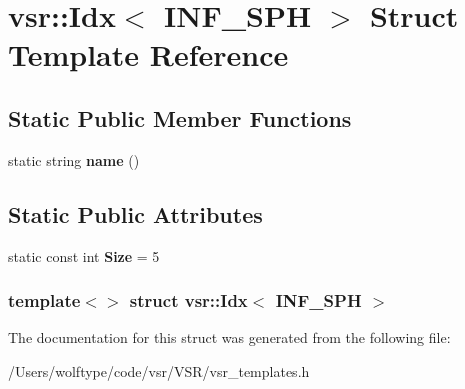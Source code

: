 \hypertarget{structvsr_1_1_idx_3_01_i_n_f___s_p_h_01_4}{\section{vsr\-:\-:Idx$<$ I\-N\-F\-\_\-\-S\-P\-H $>$ Struct Template Reference}
\label{structvsr_1_1_idx_3_01_i_n_f___s_p_h_01_4}
}
\subsection*{Static Public Member Functions}
\begin{DoxyCompactItemize}
\item 
\hypertarget{structvsr_1_1_idx_3_01_i_n_f___s_p_h_01_4_abb182ead485ca39c20fcfeba45398668}{static string {\bfseries name} ()}\label{structvsr_1_1_idx_3_01_i_n_f___s_p_h_01_4_abb182ead485ca39c20fcfeba45398668}

\end{DoxyCompactItemize}
\subsection*{Static Public Attributes}
\begin{DoxyCompactItemize}
\item 
\hypertarget{structvsr_1_1_idx_3_01_i_n_f___s_p_h_01_4_ae66f576d189caf87cfe3a6bbf39fc1f7}{static const int {\bfseries Size} = 5}\label{structvsr_1_1_idx_3_01_i_n_f___s_p_h_01_4_ae66f576d189caf87cfe3a6bbf39fc1f7}

\end{DoxyCompactItemize}
\subsubsection*{template$<$$>$ struct vsr\-::\-Idx$<$ I\-N\-F\-\_\-\-S\-P\-H $>$}



The documentation for this struct was generated from the following file\-:\begin{DoxyCompactItemize}
\item 
/\-Users/wolftype/code/vsr/\-V\-S\-R/vsr\-\_\-templates.\-h\end{DoxyCompactItemize}
